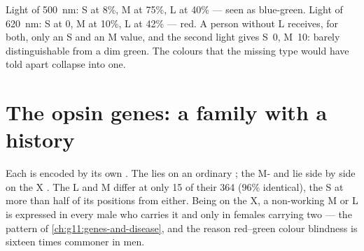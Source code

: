 \begin{example}\label{ex:g11:the-eye:curves}
Light of \qty{500}{nm}: S  at 8\%, M at 75\%, L at 40\% ---
seen as blue-green. Light of \qty{620}{nm}: S at 0, M at 10\%, L at
42\% --- red. A person without L  receives, for both, only an S
and an M value, and the second light gives S~0, M~10: barely
distinguishable from a dim green. The colours that the missing type
would have told apart collapse into one.
\end{example}

\section{The opsin genes: a family with a history}

\begin{proposition}\label{prop:g11:the-eye:genes}
Each  is encoded by its own . The   lies on an
ordinary ; the M- and   lie side by side on the
X . The L and M  differ at only 15 of their 364
 (96\% identical), the S  at more than half of its
positions from either. Being on the X, a non-working M or L  is
expressed in every male who carries it and only in females carrying
two --- the pattern of \cref{ch:g11:genes-and-disease}, and the reason
red--green colour blindness is sixteen times commoner in men.
\end{proposition}
\admitted


